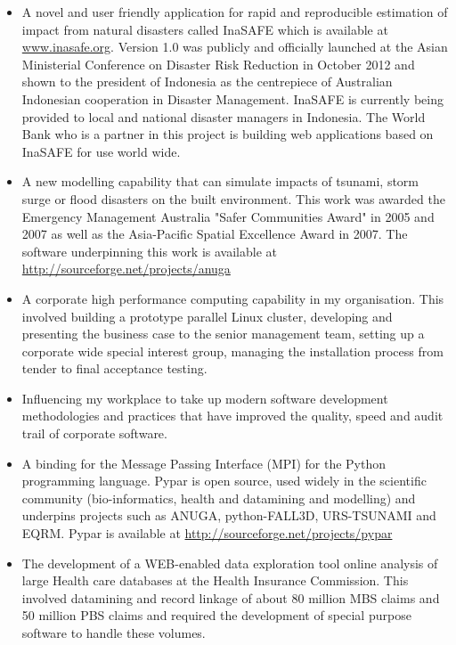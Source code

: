 \documentclass[11pt,a4paper]{article}
\begin{document}
\begin{itemize}
  \item A novel and user friendly application for rapid and reproducible estimation of impact from natural disasters called InaSAFE which is available at \url{www.inasafe.org}.
  Version 1.0 was publicly and officially launched at the Asian Ministerial Conference on Disaster Risk Reduction in October 2012 and shown to the president of Indonesia as the centrepiece of Australian Indonesian cooperation in Disaster Management. InaSAFE is currently being provided to local and national disaster managers in Indonesia. The World Bank who is a partner in this project is building web applications based on InaSAFE for use world wide.
  \item A new modelling capability that can simulate
  impacts of tsunami, storm surge or flood disasters on the built environment.
  This work was awarded the Emergency Management Australia "Safer Communities Award" in 2005 and 2007 as well as the
  Asia-Pacific Spatial Excellence Award in 2007.
  The software underpinning this work is available at \url{http://sourceforge.net/projects/anuga}
  \item A corporate high performance computing capability in my organisation.
  This involved building a prototype parallel Linux cluster, developing and presenting the business case to the
  senior management team, setting up a corporate wide special interest group, managing the installation process
  from tender to final acceptance testing.
  \item Influencing my workplace to take up modern software development methodologies and practices that
  have improved the quality, speed and audit trail of corporate software.
  \item A binding for the Message Passing Interface (MPI) for the Python programming language.
  Pypar is open source, used widely in the scientific community (bio-informatics, health and datamining and modelling) and underpins projects such as ANUGA, python-FALL3D, URS-TSUNAMI and EQRM.
  Pypar is available at \url{http://sourceforge.net/projects/pypar}
  \item The development of a WEB-enabled
  data exploration tool online analysis of large Health care databases
  at the Health Insurance Commission. This involved datamining and record linkage of about 80 million
  MBS claims and 50 million PBS claims and required the development of special purpose software to
  handle these volumes.

\end{itemize}
\end{document}
